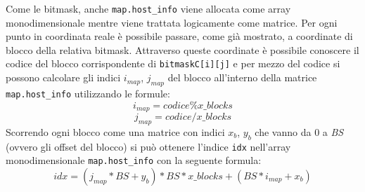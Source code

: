			Come le bitmask, anche \texttt{map.host\_info} viene allocata come array monodimensionale mentre viene trattata logicamente come matrice. Per ogni punto in coordinata reale \`{e} possibile passare, come gi\`{a} mostrato, a coordinate di blocco della relativa bitmask. Attraverso queste coordinate \`{e} possibile conoscere il codice del blocco corrispondente di \texttt{bitmaskC[i][j]} e per mezzo del codice si possono calcolare gli indici $i_{map}$, $j_{map}$ del blocco all'interno della matrice \texttt{map.host\_info} utilizzando le formule:
			\[
				i_{map} = codice  \%  x\_blocks
			\]
			\[
				j_{map} = codice / x\_blocks
			\]
			Scorrendo ogni blocco come una matrice con indici $x_b$, $y_b$ che vanno da 0 a \textit{BS} (ovvero gli offset del blocco) si pu\`{o} ottenere l'indice \texttt{idx} nell'array monodimensionale \texttt{map.host\_info} con la seguente formula:
			\[
				idx = (j_{map}*BS+y_b)*BS*x\_blocks + (BS*i_{map}+x_{b})
			\]

